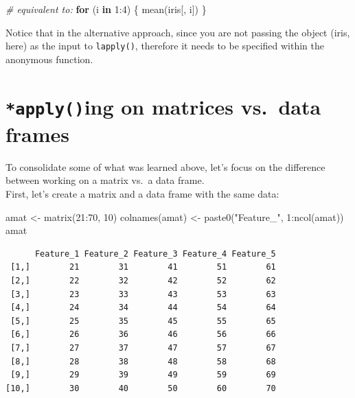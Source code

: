 \documentclass[
]{book}
\newenvironment{Shaded}{\begin{snugshade}}{\end{snugshade}}
\newcommand{\CommentTok}[1]{\textcolor[rgb]{0.56,0.35,0.01}{\textit{#1}}}
\newcommand{\ControlFlowTok}[1]{\textcolor[rgb]{0.13,0.29,0.53}{\textbf{#1}}}
\newcommand{\DecValTok}[1]{\textcolor[rgb]{0.00,0.00,0.81}{#1}}
\newcommand{\FunctionTok}[1]{\textcolor[rgb]{0.00,0.00,0.00}{#1}}
\newcommand{\NormalTok}[1]{#1}
\newcommand{\OtherTok}[1]{\textcolor[rgb]{0.56,0.35,0.01}{#1}}
\newcommand{\SpecialCharTok}[1]{\textcolor[rgb]{0.00,0.00,0.00}{#1}}
\newcommand{\StringTok}[1]{\textcolor[rgb]{0.31,0.60,0.02}{#1}}
\begin{document}
\begin{Shaded}
\begin{Highlighting}[]
\CommentTok{\# equivalent to:}
\ControlFlowTok{for}\NormalTok{ (i }\ControlFlowTok{in} \DecValTok{1}\SpecialCharTok{:}\DecValTok{4}\NormalTok{) \{}
  \FunctionTok{mean}\NormalTok{(iris[, i])}
\NormalTok{\}}
\end{Highlighting}
\end{Shaded}

Notice that in the alternative approach, since you are not passing the object (iris, here) as the input to \texttt{lapply()}, therefore it needs to be specified within the anonymous function.

\hypertarget{applying-on-matrices-vs.-data-frames}{%
\section{\texorpdfstring{\texttt{*apply()}ing on matrices vs.~data frames}{*apply()ing on matrices vs.~data frames}}\label{applying-on-matrices-vs.-data-frames}}

To consolidate some of what was learned above, let's focus on the difference between working on a matrix vs.~a data frame.\\
First, let's create a matrix and a data frame with the same data:

\begin{Shaded}
\begin{Highlighting}[]
\NormalTok{amat }\OtherTok{\textless{}{-}} \FunctionTok{matrix}\NormalTok{(}\DecValTok{21}\SpecialCharTok{:}\DecValTok{70}\NormalTok{, }\DecValTok{10}\NormalTok{)}
\FunctionTok{colnames}\NormalTok{(amat) }\OtherTok{\textless{}{-}} \FunctionTok{paste0}\NormalTok{(}\StringTok{"Feature\_"}\NormalTok{, }\DecValTok{1}\SpecialCharTok{:}\FunctionTok{ncol}\NormalTok{(amat))}
\NormalTok{amat}
\end{Highlighting}
\end{Shaded}

\begin{verbatim}
      Feature_1 Feature_2 Feature_3 Feature_4 Feature_5
 [1,]        21        31        41        51        61
 [2,]        22        32        42        52        62
 [3,]        23        33        43        53        63
 [4,]        24        34        44        54        64
 [5,]        25        35        45        55        65
 [6,]        26        36        46        56        66
 [7,]        27        37        47        57        67
 [8,]        28        38        48        58        68
 [9,]        29        39        49        59        69
[10,]        30        40        50        60        70
\end{verbatim}
\end{document}
